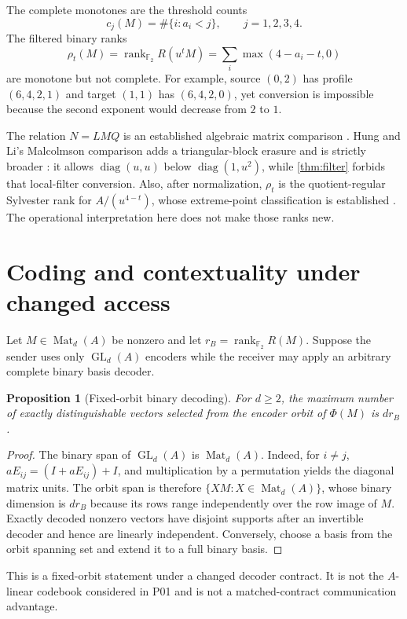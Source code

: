 \documentclass[11pt]{article}
\newtheorem{proposition}[theorem]{Proposition}
\theoremstyle{definition}
\theoremstyle{remark}
\newcommand{\F}{\mathbb F_2}
\newcommand{\Mat}{\operatorname{Mat}}
\newcommand{\GL}{\operatorname{GL}}
\newcommand{\rank}{\operatorname{rank}}
\newcommand{\diag}{\operatorname{diag}}
\begin{document}
The complete monotones are the threshold counts
\[
  c_j(M)=\#\{i:a_i<j\},\qquad j=1,2,3,4.
\]
The filtered binary ranks
\[
  \rho_t(M)=\rank_{\F}R(u^tM)
  =\sum_i\max(4-a_i-t,0)
\]
are monotone but not complete. For example, source $(0,2)$ has profile $(6,4,2,1)$ and target $(1,1)$ has $(6,4,2,0)$, yet conversion is impossible because the second exponent would decrease from $2$ to $1$.

The relation $N=LMQ$ is an established algebraic matrix comparison \cite{APGPS,AntoineRing}. Hung and Li's Malcolmson comparison adds a triangular-block erasure and is strictly broader \cite{HungLi}: it allows $\diag(u,u)$ below $\diag(1,u^2)$, while \cref{thm:filter} forbids that local-filter conversion. Also, after normalization, $\rho_t$ is the quotient-regular Sylvester rank for $A/(u^{4-t})$, whose extreme-point classification is established \cite{JZLA}. The operational interpretation here does not make those ranks new.

\section{Coding and contextuality under changed access}

Let $M\in\Mat_d(A)$ be nonzero and let $r_B=\rank_{\F}R(M)$. Suppose the sender uses only $\GL_d(A)$ encoders while the receiver may apply an arbitrary complete binary basis decoder.

\begin{proposition}[Fixed-orbit binary decoding]\label{prop:code}
For $d\ge2$, the maximum number of exactly distinguishable vectors selected from the encoder orbit of $\Phi(M)$ is $d r_B$.
\end{proposition}

\begin{proof}
The binary span of $\GL_d(A)$ is $\Mat_d(A)$. Indeed, for $i\ne j$,
$aE_{ij}=(I+aE_{ij})+I$, and multiplication by a permutation yields the diagonal matrix units. The orbit span is therefore $\{XM:X\in\Mat_d(A)\}$, whose binary dimension is $d r_B$ because its rows range independently over the row image of $M$. Exactly decoded nonzero vectors have disjoint supports after an invertible decoder and hence are linearly independent. Conversely, choose a basis from the orbit spanning set and extend it to a full binary basis.
\end{proof}

This is a fixed-orbit statement under a changed decoder contract. It is not the $A$-linear codebook considered in P01 and is not a matched-contract communication advantage.
\end{document}
